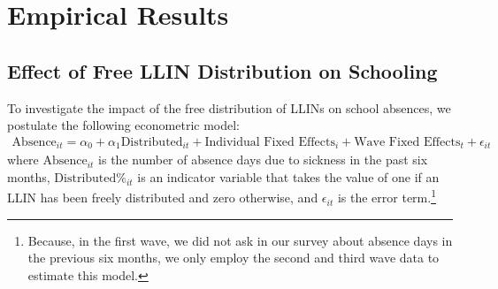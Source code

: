 \documentclass[fleqn,11pt]{article}
\begin{document}
% 

% 

% 


\section{Empirical Results}

\label{Feb 02 20:20:28 2013}

\subsection{Effect of Free LLIN Distribution on Schooling}

To investigate the impact of the free distribution of LLINs on school absences, we postulate
the following econometric model: 
\begin{gather}
\text{Absence}_{it}=\alpha _0+\alpha _1 \text{
Distributed} _{it} + \text{Individual Fixed Effects}_i + \text{Wave Fixed Effects}_t +  \epsilon _{it}
\end{gather}
where $\text{Absence}_{it}$ is the number of absence days due to sickness in the past six months, $\text{Distributed%
} _{it}$ is an indicator variable that takes the value of one if an LLIN has been freely distributed and zero otherwise, and $\epsilon _{it}$
is the error term.\footnote{Because, in the first
wave, we did not ask in our survey about absence days in the previous six months,
we only employ the second and third wave data to estimate this model.}
\end{document}
